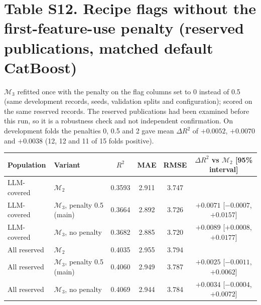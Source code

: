 \documentclass[10pt]{article}
\begin{document}
\section*{Table S12. Recipe flags without the first-feature-use penalty (reserved publications, matched default CatBoost)}
$\mathcal{M}_3$ refitted once with the penalty on the flag columns set to 0 instead of 0.5 (same development records, seeds, validation splits and configuration); scored on the same reserved records. The reserved publications had been examined before this run, so it is a robustness check and not independent confirmation. On development folds the penalties 0, 0.5 and 2 gave mean $\Delta R^2$ of $+0.0052$, $+0.0070$ and $+0.0038$ (12, 12 and 11 of 15 folds positive).\par\smallskip
\begin{tabular}{llcccc}\toprule Population & Variant & $R^2$ & MAE & RMSE & $\Delta R^2$ vs $\mathcal{M}_2$ [95\% interval]\\\midrule
LLM-covered & $\mathcal{M}_2$ & 0.3593 & 2.911 & 3.747 & \\
LLM-covered & $\mathcal{M}_3$, penalty 0.5 (main) & 0.3664 & 2.892 & 3.726 & $+0.0071$ [$-0.0007$, $+0.0157$]\\
LLM-covered & $\mathcal{M}_3$, no penalty & 0.3682 & 2.885 & 3.720 & $+0.0089$ [$+0.0008$, $+0.0177$]\\
All reserved & $\mathcal{M}_2$ & 0.4035 & 2.955 & 3.794 & \\
All reserved & $\mathcal{M}_3$, penalty 0.5 (main) & 0.4060 & 2.949 & 3.787 & $+0.0025$ [$-0.0011$, $+0.0062$]\\
All reserved & $\mathcal{M}_3$, no penalty & 0.4069 & 2.944 & 3.784 & $+0.0034$ [$-0.0004$, $+0.0072$]\\
\bottomrule\end{tabular}\par
\end{document}
